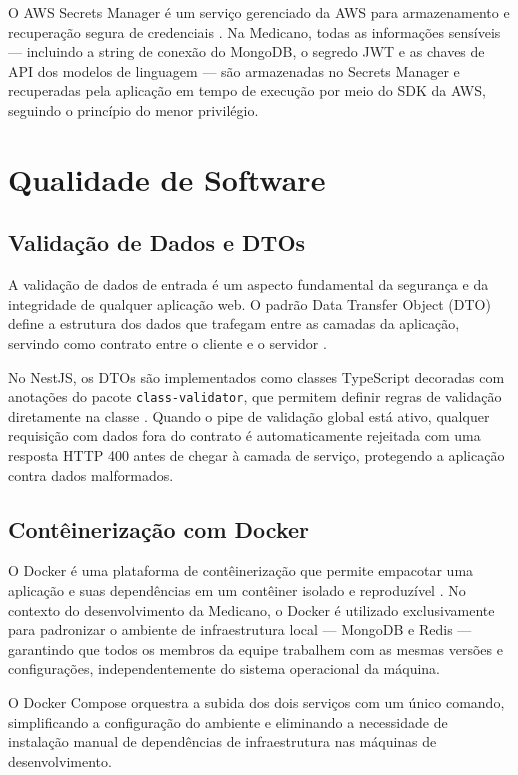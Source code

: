 O AWS Secrets Manager é um serviço gerenciado da AWS
para armazenamento e recuperação segura de credenciais
\cite{awssm}. Na Medicano, todas as informações
sensíveis — incluindo a string de conexão do MongoDB,
o segredo JWT e as chaves de API dos modelos de
linguagem — são armazenadas no Secrets Manager e
recuperadas pela aplicação em tempo de execução por
meio do SDK da AWS, seguindo o princípio do menor
privilégio.

\section{Qualidade de Software}
\label{sec:software-quality}

\subsection{Validação de Dados e DTOs}
\label{subsec:validation}

A validação de dados de entrada é um aspecto fundamental
da segurança e da integridade de qualquer aplicação web.
O padrão Data Transfer Object (DTO) define a estrutura
dos dados que trafegam entre as camadas da aplicação,
servindo como contrato entre o cliente e o servidor
\cite{martin2017}.

No NestJS, os DTOs são implementados como classes
TypeScript decoradas com anotações do pacote
\texttt{class-validator}, que permitem definir regras
de validação diretamente na classe \cite{nestjs2024}.
Quando o pipe de validação global está ativo, qualquer
requisição com dados fora do contrato é automaticamente
rejeitada com uma resposta HTTP 400 antes de chegar
à camada de serviço, protegendo a aplicação contra
dados malformados.

\subsection{Contêinerização com Docker}
\label{subsec:docker}

O Docker é uma plataforma de contêinerização que
permite empacotar uma aplicação e suas dependências
em um contêiner isolado e reproduzível
\cite{docker2024}. No contexto do desenvolvimento
da Medicano, o Docker é utilizado exclusivamente
para padronizar o ambiente de infraestrutura local
— MongoDB e Redis — garantindo que todos os membros
da equipe trabalhem com as mesmas versões e
configurações, independentemente do sistema
operacional da máquina.

O Docker Compose orquestra a subida dos dois
serviços com um único comando, simplificando a
configuração do ambiente e eliminando a necessidade
de instalação manual de dependências de
infraestrutura nas máquinas de desenvolvimento.

